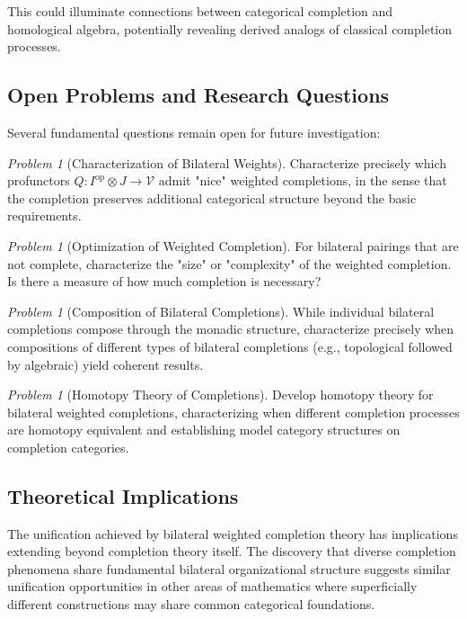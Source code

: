 \documentclass[11pt]{article}
\theoremstyle{plain}
\theoremstyle{definition}
\theoremstyle{remark}
\newtheorem{problem}[theorem]{Problem}
\newcommand{\V}{\mathcal{V}}
\newcommand{\op}{\mathrm{op}}
\begin{document}
This could illuminate connections between categorical completion and homological algebra, potentially revealing derived analogs of classical completion processes.

\subsection{Open Problems and Research Questions}

Several fundamental questions remain open for future investigation:

\begin{problem}[Characterization of Bilateral Weights]
Characterize precisely which profunctors $Q : I^{\op} \otimes J \to \V$ admit "nice" weighted completions, in the sense that the completion preserves additional categorical structure beyond the basic requirements.
\end{problem}

\begin{problem}[Optimization of Weighted Completion]
For bilateral pairings that are not complete, characterize the "size" or "complexity" of the weighted completion. Is there a measure of how much completion is necessary?
\end{problem}

\begin{problem}[Composition of Bilateral Completions]
While individual bilateral completions compose through the monadic structure, characterize precisely when compositions of different types of bilateral completions (e.g., topological followed by algebraic) yield coherent results.
\end{problem}

\begin{problem}[Homotopy Theory of Completions]
Develop homotopy theory for bilateral weighted completions, characterizing when different completion processes are homotopy equivalent and establishing model category structures on completion categories.
\end{problem}

\subsection{Theoretical Implications}

The unification achieved by bilateral weighted completion theory has implications extending beyond completion theory itself. The discovery that diverse completion phenomena share fundamental bilateral organizational structure suggests similar unification opportunities in other areas of mathematics where superficially different constructions may share common categorical foundations.
\end{document}
